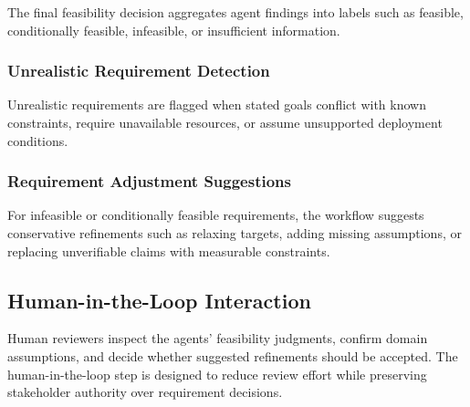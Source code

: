 The final feasibility decision aggregates agent findings into labels such as feasible, conditionally feasible, infeasible, or insufficient information.

\subsubsection{Unrealistic Requirement Detection}
\label{method:unrealistic_detection}

Unrealistic requirements are flagged when stated goals conflict with known constraints, require unavailable resources, or assume unsupported deployment conditions.

\subsubsection{Requirement Adjustment Suggestions}
\label{method:adjustment}

For infeasible or conditionally feasible requirements, the workflow suggests conservative refinements such as relaxing targets, adding missing assumptions, or replacing unverifiable claims with measurable constraints.

\subsection{Human-in-the-Loop Interaction}
\label{method:hitl}

Human reviewers inspect the agents' feasibility judgments, confirm domain assumptions, and decide whether suggested refinements should be accepted.
The human-in-the-loop step is designed to reduce review effort while preserving stakeholder authority over requirement decisions.
